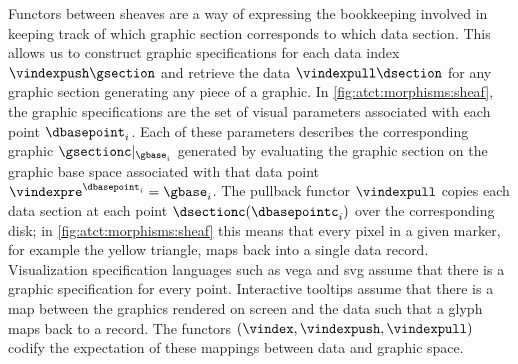 \documentclass[10pt,journal,compsoc]{IEEEtran}
\theoremstyle{definition}
\theoremstyle{remark}
\begin{document}
Functors between sheaves are a way of expressing the bookkeeping involved in keeping track of which graphic section corresponds to which data section. This allows us to construct graphic specifications for each data index $\vindexpush\gsection$ and retrieve the data $\vindexpull\dsection$ for any graphic section generating any piece of a graphic. In \autoref{fig:atct:morphisms:sheaf}, the graphic specifications are the set of visual parameters associated with each point $\dbasepoint_i$. Each of these parameters describes the corresponding graphic $\gsectionc|_{\gbase_i}$ generated by evaluating the graphic section on the graphic base space associated with that data point $\vindexpre^{\dbasepoint_i} = \gbase_i$. The pullback functor $\vindexpull$ copies each data section at each point $\dsectionc(\dbasepointc_i)$ over the corresponding disk; in \autoref{fig:atct:morphisms:sheaf} this means that every pixel in a given marker, for example the yellow triangle, maps back into a single data record. Visualization specification languages such as vega \cite{heerDeclarative2010} and svg \cite{quintScalable2003} assume that there is a graphic  specification for every point. Interactive tooltips assume that there is a map between the graphics rendered on screen and the data such that a glyph maps back to a record. The functors $(\vindex, \vindexpush, \vindexpull)$ codify the expectation of these mappings between data and graphic space. 
\end{document}
